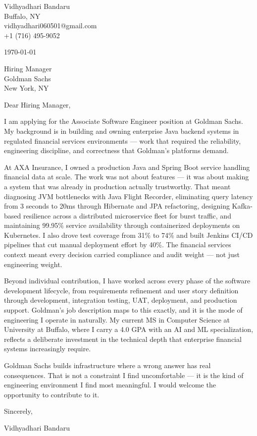 \documentclass[11pt,letterpaper]{article}
\begin{document}
\fontsize{11}{14}\selectfont

Vidhyadhari Bandaru\\
Buffalo, NY\\
vidhyadhari060501@gmail.com\\
+1 (716) 495-9052

\vspace{6pt}
\today

\vspace{6pt}
Hiring Manager\\
Goldman Sachs\\
New York, NY

\vspace{6pt}
Dear Hiring Manager,

I am applying for the Associate Software Engineer position at Goldman Sachs. My background is in building and owning enterprise Java backend systems in regulated financial services environments — work that required the reliability, engineering discipline, and correctness that Goldman's platforms demand.

At AXA Insurance, I owned a production Java and Spring Boot service handling financial data at scale. The work was not about features — it was about making a system that was already in production actually trustworthy. That meant diagnosing JVM bottlenecks with Java Flight Recorder, eliminating query latency from 3 seconds to 20ms through Hibernate and JPA refactoring, designing Kafka-based resilience across a distributed microservice fleet for burst traffic, and maintaining 99.95\% service availability through containerized deployments on Kubernetes. I also drove test coverage from 31\% to 74\% and built Jenkins CI/CD pipelines that cut manual deployment effort by 40\%. The financial services context meant every decision carried compliance and audit weight — not just engineering weight.

Beyond individual contribution, I have worked across every phase of the software development lifecycle, from requirements refinement and user story definition through development, integration testing, UAT, deployment, and production support. Goldman's job description maps to this exactly, and it is the mode of engineering I operate in naturally. My current MS in Computer Science at University at Buffalo, where I carry a 4.0 GPA with an AI and ML specialization, reflects a deliberate investment in the technical depth that enterprise financial systems increasingly require.

Goldman Sachs builds infrastructure where a wrong answer has real consequences. That is not a constraint I find uncomfortable — it is the kind of engineering environment I find most meaningful. I would welcome the opportunity to contribute to it.

Sincerely,

\vspace{14pt}
Vidhyadhari Bandaru
\end{document}
